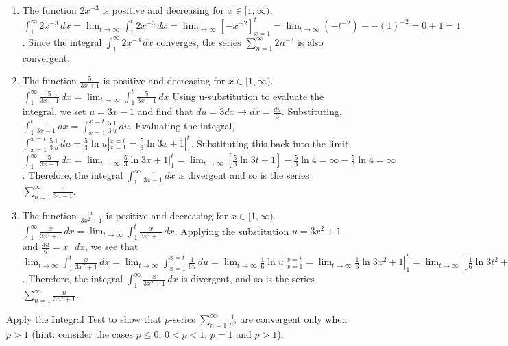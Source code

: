 \begin{Answer}[ref= series1]
\begin{enumerate}
\item The function $2x^{-3}$ is positive and decreasing for $x \in [1, \infty)$. 
$\int_1^\infty 2x^{-3}\,dx = \lim_{t \to \infty} \int_1^t 2x^{-3}\,dx = \lim_{t 
\to \infty} \left[-x^{-2} \right]_{x = 1}^t = \lim_{t \to \infty} ( -t^{-2}) - 
-(1)^{-2} = 0 + 1 = 1$. Since the integral $\int_1^\infty 2x^{-3}\,dx$ converges, 
the series $\sum_{n = 1}^\infty 2n^{-3}$ is also convergent.
\item The function $\frac{5}{3x+1}$ is positive and decreasing for $x \in [1, 
\infty)$. $\int_1^\infty \frac{5}{3x-1}\,dx = \lim_{t \to \infty} \int_1^t 
\frac{5}{3x-1}\,dx$ Using u-substitution to evaluate the integral, we set $u = 
3x-1$ and find that $du = 3dx \rightarrow dx = \frac{du}{3}$. Substituting, 
$\int_1^t \frac{5}{3x-1}\,dx = \int_{x=1}^{x=t} \frac{5}{3}\frac{1}{u}\,du$. 
Evaluating the integral, $\int_{x=1}^{x=t} \frac{5}{3}\frac{1}{u}\,du = 
\frac{5}{3}\ln{u}|_{x = 1}^{x =t} = \frac{5}{3}\ln{3x+1}|_{1}^t$. Substituting 
this back into the limit, $\int_1^\infty \frac{5}{3x-1}\,dx = \lim_{t \to 
\infty} \frac{5}{3}\ln{3x+1}|_{1}^t = \lim_{t \to \infty} [ \frac{5}{3} 
\ln{3t+1} ] - \frac{5}{3}\ln{4} = \infty - \frac{5}{3}\ln{4} = \infty$. 
Therefore, the integral $\int_1^\infty \frac{5}{3x-1}\,dx$ is divergent and so 
is the series $\sum_{n = 1}^\infty \frac{5}{3n-1}$.
\item The function $\frac{x}{3x^2 + 1}$ is positive and decreasing for $x\in 
[1,\infty)$. $\int_1^\infty \frac{x}{3x^2 + 1}\,dx = \lim_{t \to \infty} 
\int_1^t \frac{x}{3x^2 + 1}\,dx$. Applying the substitution $u = 3x^2 + 1$ 
and $\frac{du}{6} = x\text{ }dx$, we see that $\lim_{t \to \infty} \int_1^t 
\frac{x}{3x^2 + 1}\,dx = \lim_{t \to \infty} \int_{x=1}^{x=t} \frac{1}{6u}\,du 
= \lim_{t \to \infty} \frac{1}{6}\ln{u}|_{x = 1}^{x = t} = \lim_{t \to \infty} 
\frac{1}{6}\ln{3x^2 + 1}|_{1}^{t} = \lim_{t \to \infty} \left[ \frac{1}{6}
\ln{3t^2 + 1} \right] - \frac{1}{6}\ln{4} = \infty$. Therefore, the integral 
$\int_1^\infty \frac{x}{3x^2 + 1}\,dx$ is divergent, and so is the series 
$\sum_{n = 1}^\infty \frac{n}{3n^2 + 1}$. 
\end{enumerate}
\end{Answer}

\begin{Exercise}[label = pseries]
Apply the Integral Test to show that $p$-series $\sum_{n=1}^\infty \frac{1}{
n^p}$ are convergent only when $p > 1$ (hint: consider the cases $p \leq 0$, 
$0 < p < 1$, $p=1$ and $p > 1$).
\vspace{50mm}
\end{Exercise}

